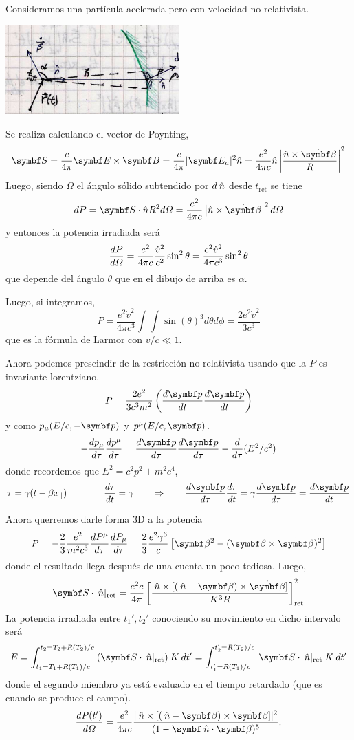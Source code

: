\documentclass[10pt,oneside]{CBFT_book}
\begin{document}
Consideramos una partícula acelerada pero con velocidad no relativista.

\includegraphics[width=0.5\textwidth]{images/fig_ft1_calculo_potencia_radiada.jpg}

Se realiza calculando el vector de Poynting,
\[
	\vb{S} = \frac{c}{4\pi} \pv{E}{B} = \frac{c}{4\pi} |\vb{E}_a|^2 \hat{n} =  \frac{e^2}{4\pi c}
		\hat{n} \left| \frac{\hat{n} \times \dot{\vb{\beta}} }{R} \right|^2
\]
Luego, siendo $\Omega$ el ángulo sólido subtendido por $d\:\hat{n}$ desde $t_\text{ret}$ se tiene
\[
	dP = \vb{S}\cdot\hat{n} R^2 d\Omega =
		\frac{e^2}{4\pi c} \left| \hat{n} \times \dot{\vb{\beta}} \right|^2 d\Omega
\]
y entonces la potencia irradiada será
\[
	\frac{d^{\hspace{-0.05em}} {P}}{d {\Omega}^{\hspace{-0.05em}}} = \frac{e^2}{4\pi c} \frac{\dot{v}^2}{c^2} \sin^2\theta = 
		\frac{e^2 \dot{v}^2 }{4\pi c^3} \sin^2\theta
\]
que depende del ángulo $\theta$  que en el dibujo de arriba es $\alpha$.

Luego, si integramos,
\[
	P = \frac{e^2 \dot{v}^2 }{4\pi c^3} \int\int \sin(\theta)^3 d\theta d\phi
	= \frac{2 e^2 \dot{v}^2 }{3 c^3}
\]
que es la fórmula de Larmor con $v/c \ll 1$. 

Ahora podemos prescindir de la restricción no relativista
usando que la $P$ es invariante lorentziano.
\[
	P = \frac{2 e^2}{3 c^3 m^2} \left( \dtot{\vb{p}}{t} \dtot{\vb{p}}{t} \right)
\]
y como $p_{\mu}( E/c , -\vb{p} )$ y $p^{\mu}( E/c , \vb{p} )$. 
\[
	-\dtot{p_\mu}{\tau} \dtot{p^\mu}{\tau} = \dtot{\vb{p}}{\tau} \dtot{\vb{p}}{\tau} - 
		\dtot{}{\tau}(E^2/c^2)
\]
donde recordemos que $E^2 = c^2p^2 + m^2c^4$,
\[
	\tau = \gamma (t-\beta x_\parallel) \qquad \qquad 
	\dtot{\tau}{t} = \gamma \qquad \Rightarrow \qquad 
	\dtot{\vb{p}}{\tau} \dtot{\tau}{t}= \gamma \dtot{\vb{p}}{\tau} = \dtot{\vb{p}}{t}
\]

Ahora querremos darle forma 3D a la potencia
\[
	P = - \frac{2}{3} \frac{ e^2 }{ m^2 c^3 } \dtot{P^\mu}{\tau} \dtot{P_\mu}{\tau} =
	\frac{2}{3} \frac{e^2\gamma^6}{c} \left[ \vb{\b}^2 - (\vb{\b} \times \dot{\vb{\b}})^2 \right]
\]
donde el resultado llega después de una cuenta un poco tediosa.
Luego,
\[
	\vb{S}\cdot\nver|_\text{ret} = 
	\frac{e^2 c}{4\pi} \left[ \frac{ \nver \times [ (\nver-\vb{\b})\times \dot{\vb{\b}} ]}{K^3 R}
	\right]_{\text{ret}}^2
\]
La potencia irradiada entre $t_1', t_2'$ conociendo su movimiento en dicho intervalo será
\[
	E = \int_{t_1=T_1+R(T_1)/c}^{t_2=T_2+R(T_2)/c} \: (\vb{S}\cdot\nver|_\text{ret}) \: K \: dt' =
	\int_{t_1'= R(T_1)/c}^{t_2'= R(T_2)/c} \: \vb{S}\cdot\nver|_\text{ret} \: K \: dt'
\]
donde el segundo miembro ya está evaluado en el tiempo retardado (que es cuando se produce
el campo).
\[
	\dtot{P(t')}{\Omega} = \frac{e^2}{4\pi c} 
	\frac{ | \nver \times [ (\nver-\vb{\b})\times \dot{\vb{\b}} ] |^2}{ ( 1 - \pe{\nver}{\b} )^5 }.
\]
\end{document}
